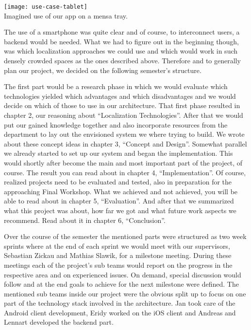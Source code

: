 \begin{center}
    \texttt{[image: use-case-tablet]}\\
    Imagined use of our app on a mensa tray.
\end{center}

The use of a smartphone was quite clear and of course, to interconnect users, a backend would be needed. What we had to figure out in the beginning though, was which localization approaches we could use and which would work in such densely crowded spaces as the ones described above. Therefore and to generally plan our project, we decided on the following semester's structure.

The first part would be a research phase in which we would evaluate which technologies yielded which advantages and which disadvantages and we would decide on which of those to use in our architecture. That first phase resulted in chapter 2, our reasoning about \enquote{Localization Technologies}. After that we would put our gained knowledge together and also incorporate resources from the department to lay out the envisioned system we where trying to build. We wrote about these concept ideas in chapter 3, \enquote{Concept and Design}. Somewhat parallel we already started to set up our system and began the implementation. This would shortly after become the main and most important part of the project, of course. The result you can read about in chapter 4, \enquote{Implementation}. Of course, realized projects need to be evaluated and tested, also in preparation for the approaching Final Workshop. What we achieved and not achieved, you will be able to read about in chapter 5, \enquote{Evaluation}. And after that we summarized what this project was about, how far we got and what future work aspects we recommend. Read about it in chapter 6, \enquote{Conclusion}.

Over the course of the semester the mentioned parts were structured as two week sprints where at the end of each sprint we would meet with our supervisors, Sebastian Zickau and Mathias Slawik, for a milestone meeting. During these meetings each of the project's sub teams would report on the progress in the respective area and on experienced issues. On demand, special discussion would follow and at the end goals to achieve for the next milestone were defined. The mentioned sub teams inside our project were the obvious split up to focus on one part of the technology stack involved in the architecture. Jan took care of the Android client development, Eridy worked on the iOS client and Andreas and Lennart developed the backend part.

